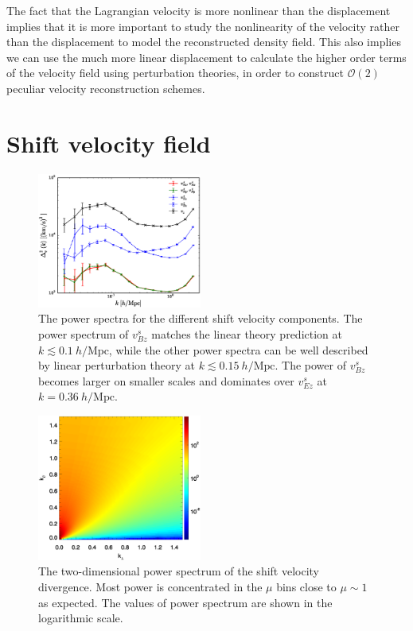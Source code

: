 \documentclass[aps,prx,twocolumn,superscriptaddress,groupedaddress,nofootinbib,amsfont]{revtex4}  %
\newcommand{\mr}{\mathrm}
\begin{document}
The fact that the Lagrangian velocity is more nonlinear than the displacement
implies that it is more important to study the nonlinearity of the velocity
rather than the displacement to model the reconstructed density field.
This also implies we can use the much more linear displacement to calculate
the higher order terms of the velocity field using perturbation theories, in 
order to construct $\mathcal{O}(2)$ peculiar velocity reconstruction schemes.


\section{Shift velocity field}
\label{appendix:C}

\begin{figure}[tbp]
\begin{center}
\includegraphics[width=0.48\textwidth]{f4.eps}
\end{center}
\vspace{-0.7cm}
\caption{The power spectra for the different shift velocity components.
The power spectrum of ${v^s_{Bz}}$ matches the linear theory prediction at 
$k\lesssim0.1\ h/\mr{Mpc}$, while the other power spectra can be well described 
by linear perturbation theory at $k\lesssim0.15\ h/\mr{Mpc}$. 
The power of $v^s_{Bz}$ becomes larger on smaller scales and dominates over 
$v^s_{Ez}$ at $k=0.36\ h/\mr{Mpc}$.}
\label{fig:pk_vels}
\end{figure}

\begin{figure}[tbp]
\vspace{-0.5cm}
\begin{center}
\includegraphics[width=0.48\textwidth]{0.000anipk_deltaV_4x.eps}
\end{center}
\vspace{-0.7cm}
\caption{The two-dimensional power spectrum of the shift velocity divergence.
Most power is concentrated in the $\mu$ bins close to $\mu\sim1$ as expected.
The values of power spectrum are shown in the logarithmic scale.}
\label{fig:pk_deltaV}
\end{figure}
\end{document}

